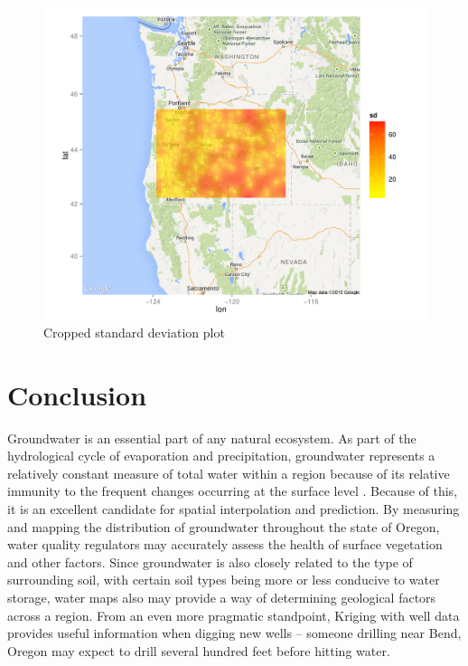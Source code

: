 \documentclass[12pt,twoside]{reedthesis}
\begin{document}
\begin{figure}[h]
	   
	       \centering
	  
	    \includegraphics[scale=0.9]{sd_crop}
	
	     \caption{Cropped standard deviation plot}
	 \label{sdcrop}
	\end{figure}
	

\chapter*{Conclusion}
	\setcounter{chapter}{4}
	\setcounter{section}{0}
	
Groundwater is an essential part of any natural ecosystem. As part of the hydrological cycle of evaporation and precipitation, groundwater represents a relatively constant measure of total water within a region because of its relative immunity to the frequent changes occurring at the surface level \cite{groundwater}. Because of this, it is an excellent candidate for spatial interpolation and prediction. By measuring and mapping the distribution of groundwater throughout the state of Oregon, water quality regulators may accurately assess the health of surface vegetation and other factors. Since groundwater is also closely related to the type of surrounding soil, with certain soil types being more or less conducive to water storage, water maps also may provide a way of determining geological factors across a region. From an even more pragmatic standpoint, Kriging with well data provides useful information when digging new wells -- someone drilling near Bend, Oregon may expect to drill several hundred feet before hitting water. \\
\end{document}
